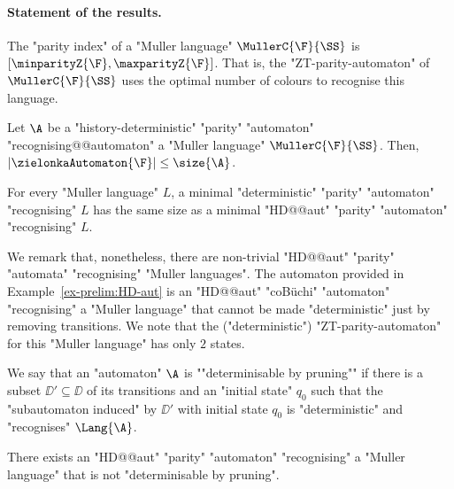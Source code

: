 \documentclass{theoretics}
\begin{document}
\paragraph*{Statement of the results.}
\begin{theorem}\label{thm-zt:optimality_ZTparity-priorities}
	The "parity index" of a "Muller language" $\MullerC{\F}{\SS}$ is $[\minparityZ{\F}, \maxparityZ{\F}]$. That is, the "ZT-parity-automaton" of $\MullerC{\F}{\SS}$ uses the optimal number of colours to recognise this language.
\end{theorem}



\begin{theorem}\label{thm-zt:strong_optimality_ZTparity}
	Let $\A$ be a "history-deterministic" "parity" "automaton" "recognising@@automaton" a "Muller language" $\MullerC{\F}{\SS}$. Then, $|\zielonkaAutomaton{\F}|\leq \size{\A}$.
\end{theorem}

\begin{corollary}\label{cor-zt:no-small-HD-for-Muller}
	For every "Muller language" $L$, a minimal "deterministic" "parity" "automaton" "recognising" $L$ has the same size as a minimal "HD@@aut" "parity" "automaton" "recognising" $L$.
\end{corollary}



\AP We remark that, nonetheless, there are non-trivial "HD@@aut" "parity" "automata" "recognising" "Muller languages". The automaton provided in Example~\ref{ex-prelim:HD-aut} is an "HD@@aut" "coB\"uchi" "automaton" "recognising" a "Muller language" that cannot be made "deterministic" just by removing transitions. We note that the ("deterministic") "ZT-parity-automaton" for this "Muller language" has only $2$ states. 

\AP We say that an "automaton" $\A$ is ""determinisable by pruning"" if there is a subset $\DD'\subseteq \DD$ of its transitions and an "initial state" $q_0$ such that the "subautomaton induced" by $\DD'$ with initial state $q_0$ is "deterministic" and "recognises" $\Lang{\A}$.

\begin{proposition}
	There exists an  "HD@@aut" "parity" "automaton" "recognising" a "Muller language" that is not "determinisable by pruning".
\end{proposition}
\end{document}
